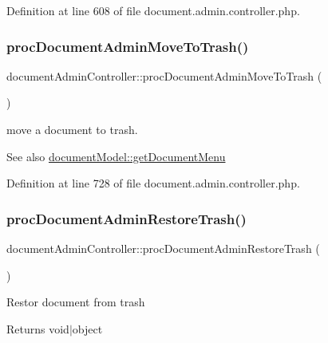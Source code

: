 Definition at line 608 of file document.\+admin.\+controller.\+php.

\hypertarget{classdocumentAdminController_a8dfa5d37621daaba6c66732eb3568730}{}\label{classdocumentAdminController_a8dfa5d37621daaba6c66732eb3568730} 
\subsubsection{\texorpdfstring{proc\+Document\+Admin\+Move\+To\+Trash()}{procDocumentAdminMoveToTrash()}}
{\footnotesize\ttfamily document\+Admin\+Controller\+::proc\+Document\+Admin\+Move\+To\+Trash (\begin{DoxyParamCaption}{ }\end{DoxyParamCaption})}



move a document to trash. 

\begin{DoxySeeAlso}{See also}
\hyperlink{classdocumentModel_ac7c07ca7bd1c7e72f4fcacfb176097b0}{document\+Model\+::get\+Document\+Menu} 
\end{DoxySeeAlso}


Definition at line 728 of file document.\+admin.\+controller.\+php.

\hypertarget{classdocumentAdminController_ac0467d27983d60c51c1128765244a36b}{}\label{classdocumentAdminController_ac0467d27983d60c51c1128765244a36b} 
\subsubsection{\texorpdfstring{proc\+Document\+Admin\+Restore\+Trash()}{procDocumentAdminRestoreTrash()}}
{\footnotesize\ttfamily document\+Admin\+Controller\+::proc\+Document\+Admin\+Restore\+Trash (\begin{DoxyParamCaption}{ }\end{DoxyParamCaption})}

Restor document from trash \begin{DoxyReturn}{Returns}
void$\vert$object 
\end{DoxyReturn}


